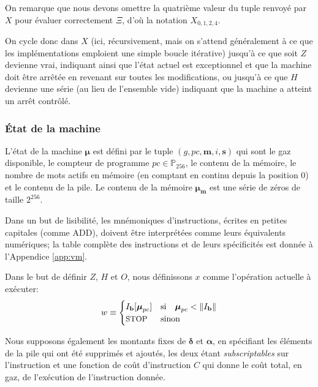 \documentclass[9pt,oneside]{amsart}
\begin{document}
\begin{multicols}{2}
On remarque que nous devons omettre la quatrième valeur du tuple renvoyé par $X$ pour évaluer correctement $\Xi$, d'où la notation $X_{0,1,2,4}$.

On cycle donc dans $X$ (ici, récursivement, mais on s'attend généralement à ce que les implémentations emploient une simple boucle itérative) jusqu'à ce que soit $Z$ devienne vrai, indiquant ainsi que l'état actuel est exceptionnel et que la machine doit être arrêtée en revenant sur toutes les modifications, ou jusqu'à ce que $H$ devienne une série (au lieu de l'ensemble vide) indiquant que la machine a atteint un arrêt contrôlé.

\subsubsection{État de la machine}
L'état de la machine $\boldsymbol{\mu}$ est défini par le tuple $(g, pc, \mathbf{m}, i, \mathbf{s})$ qui sont le gaz disponible, le compteur de programme $pc \in \mathbb{P}_{256}$, le contenu de la mémoire, le nombre de mots actifs en mémoire (en comptant en continu depuis la position 0) et le contenu de la pile. Le contenu de la mémoire $\boldsymbol{\mu}_\mathbf{m}$ est une série de zéros de taille $2^{256}$.

Dans un but de lisibilité, les mnémoniques d'instructions, écrites en petites capitales (comme {\small ADD}), doivent être interprétées comme leurs équivalents numériques; la table complète des instructions et de leurs spécificités est donnée à l'Appendice \ref{app:vm}.

Dans le but de définir $Z$, $H$ et $O$, nous définissons $x$ comme l'opération actuelle à exécuter:
\begin{equation}\label{eq:currentoperation}
w \equiv \begin{cases} I_\mathbf{b}[\boldsymbol{\mu}_{pc}] & \text{si} \quad \boldsymbol{\mu}_{pc} < \lVert I_\mathbf{b} \rVert \\
\text{\small STOP} & \text{sinon}
\end{cases}
\end{equation}

Nous supposons également les montants fixes de $\mathbf{\delta}$ et $\mathbf{\alpha}$, en spécifiant les éléments de la pile qui ont été supprimés et ajoutés, les deux étant \textit{subscriptables} sur l'instruction et une fonction de coût d'instruction $C$ qui donne le coût total, en gaz, de l'exécution de l'instruction donnée.


\end{multicols}
\end{document}

